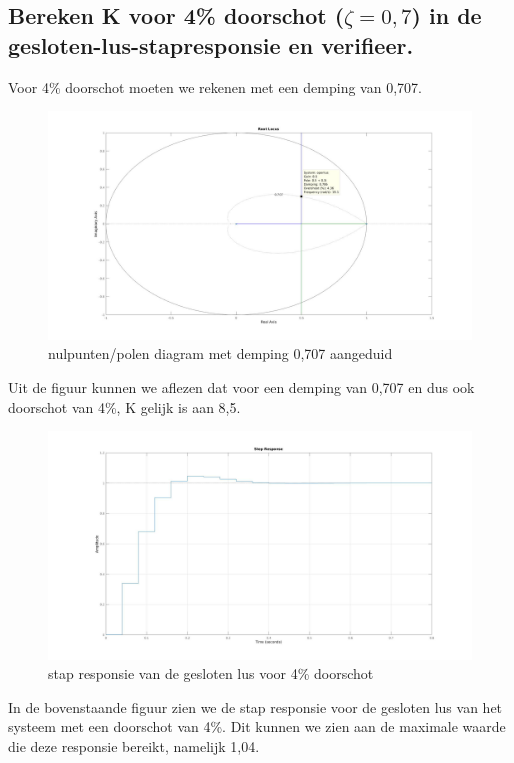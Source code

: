 \documentclass[a4paper, 12pt]{article}
\begin{document}
\subsection{Bereken K voor 4\% doorschot ($\zeta = 0,7$) in de gesloten-lus-stapresponsie en verifieer.}

Voor 4\% doorschot moeten we rekenen met een demping van 0,707.

\begin{figure}[!h]
	\includegraphics[width=0.9\linewidth]{Labo3_4_rootlocus2.jpg}
	\caption{nulpunten/polen diagram met demping 0,707 aangeduid}
\end{figure}

Uit de figuur kunnen we aflezen dat voor een demping van 0,707 en dus ook doorschot van 4\%, K gelijk is aan 8,5.

\begin{figure}[!h]
	\includegraphics[width=1\linewidth]{Labo3_4_step_response2.jpg}
	\caption{stap responsie van de gesloten lus voor 4\% doorschot}
\end{figure}

In de bovenstaande figuur zien we de stap responsie voor de gesloten lus van het systeem met een doorschot van 4\%. Dit kunnen we zien aan de maximale waarde die deze responsie bereikt, namelijk 1,04.
\end{document}
